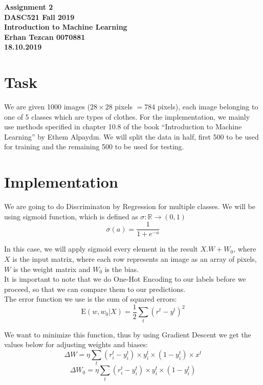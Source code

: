 \documentclass[12pt,reqno]{amsart}
\begin{document}
\begin{center}
\large\textbf{Assignment 2 \\ DASC521 Fall 2019} \\
\normalsize\textbf{Introduction to Machine Learning \\  Erhan Tezcan 0070881 \\ 18.10.2019} \\
\end{center}

\section{Task}
We are given 1000 images ($28\times28$ pixels $= 784$ pixels), each image belonging to one of 5 classes which are types of clothes. For the implementation, we mainly use methods specified in chapter 10.8 of the book ``Introduction to Machine Learning'' by Ethem Alpaydın. We will split the data in half, first 500 to be used for training and the remaining 500 to be used for testing.
\section{Implementation}
We are going to do Discriminaton by Regression for multiple classes. We will be using sigmoid function, which is defined as $\sigma: \mathbb{R} \xrightarrow{} (0, 1)$
\begin{equation}
\sigma(a) = \frac{1}{1 + e^{-a}}
\end{equation} 

In this case, we will apply sigmoid every element in the result $X.W + W_0$, where $X$ is the input matrix, where each row represents an image as an array of pixels, $W$ is the weight matrix and $W_0$ is the bias. \\

It is important to note that we do One-Hot Encoding to our labels before we proceed, so that we can compare them to our predictions. \\

The error function we use is the sum of squared errors:
\begin{equation}
\text{E}(w, w_0|X) = \frac{1}{2}\sum_t(r^t-y^t)^2
\end{equation}

We want to minimize this function, thus by using Gradient Descent we get the values below for adjusting weights and biases:
\begin{equation}
\Delta W = \eta \sum_t(r_i^t - y_i^t)\times y_i^t\times(1-y_i^t)\times x^t
\end{equation}
\begin{equation}
\Delta W_0 = \eta \sum_t(r_i^t - y_i^t)\times y_i^t\times(1-y_i^t)
\end{equation}
\end{document}

